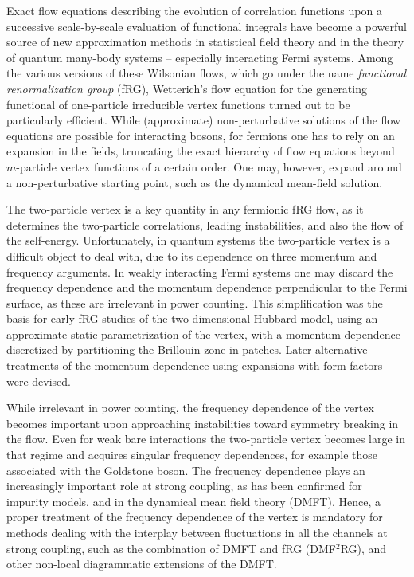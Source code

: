Exact flow equations describing the evolution of correlation functions upon a successive scale-by-scale evaluation of functional integrals have become a powerful source of new approximation methods in statistical field theory \cite{Berges2002} and in the theory of quantum many-body systems -- especially interacting Fermi systems. \cite{Metzner2012} Among the various versions of these Wilsonian flows, which go under the name {\em functional renormalization group} (fRG), Wetterich's \cite{Wetterich1993} flow equation for the generating functional of one-particle irreducible vertex functions turned out to be particularly efficient. 
While (approximate) non-perturbative solutions of the flow equations are possible for interacting bosons, for fermions one has to rely on an expansion in the fields, truncating the exact hierarchy of flow equations beyond $m$-particle vertex functions of a certain order. One may, however, expand around a non-perturbative starting point, such as the dynamical mean-field solution. \cite{Taranto2014}

The two-particle vertex is a key quantity in any fermionic fRG flow, as it determines the two-particle correlations, leading instabilities, and also the flow of the self-energy. Unfortunately, in quantum systems the two-particle vertex is a difficult object to deal with, due to its dependence on three momentum and frequency arguments. In weakly interacting Fermi systems one may discard the frequency dependence and the momentum dependence perpendicular to the Fermi surface, as these are irrelevant in power counting. This simplification was the basis for early fRG studies of the two-dimensional Hubbard model, using an approximate static parametrization of the vertex, with a momentum dependence discretized by partitioning the Brillouin zone in patches. \cite{Zanchi1996,Halboth2000,Halboth2000b,Honerkamp2001}
Later alternative treatments of the momentum dependence using expansions with form factors were devised.\cite{Husemann2009,Eberlein2013,Eberlein2016}

While irrelevant in power counting, the frequency dependence of the vertex becomes important upon approaching instabilities toward symmetry breaking in the flow.\cite{Husemann2012} Even for weak bare interactions the two-particle vertex becomes large in that regime and acquires singular frequency dependences, for example those associated with the Goldstone boson.\cite{Eberlein2013}
The frequency dependence plays an increasingly important role at strong coupling, as has been confirmed for impurity models,\cite{Kinza2013,Wentzell2016a} and in the dynamical mean field theory (DMFT).\cite{Georges1996,Rohringer2012}
Hence, a proper treatment of the frequency dependence of the vertex is mandatory for methods dealing with the interplay between fluctuations in all the channels at strong coupling, such as the combination of DMFT and fRG (DMF$^2$RG), \cite{Taranto2014} and other non-local diagrammatic extensions of the DMFT.\cite{Rohringer2017}

